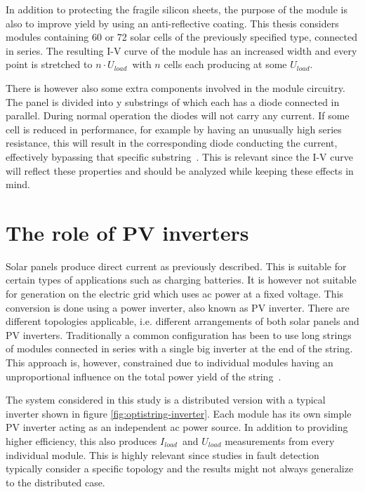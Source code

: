 
In addition to protecting the fragile silicon sheets, the purpose of the module is also to improve yield by using an anti-reflective coating.
This thesis considers modules containing 60 or 72 solar cells of the previously specified type, connected in series.
The resulting I-V curve of the module has an increased width and every point is stretched to $n \cdot U_{load}$ with $n$ cells each producing at some $U_{load}$.

There is however also some extra components involved in the module circuitry.
The panel is divided into y substrings of which each has a diode connected in parallel.
During normal operation the diodes will not carry any current.
If some cell is reduced in performance, for example by having an unusually high series resistance, this will result in the corresponding diode conducting the current, effectively bypassing that specific substring~\cite{Roman2006}.
This is relevant since the I-V curve will reflect these properties and should be analyzed while keeping these effects in mind.

\section{The role of PV inverters}
Solar panels produce direct current as previously described.
This is suitable for certain types of applications such as charging batteries.
It is however not suitable for generation on the electric grid which uses ac power at a fixed voltage.
This conversion is done using a power inverter, also known as PV inverter.
There are different topologies applicable, i.e. different arrangements of both solar panels and PV inverters.
Traditionally a common configuration has been to use long strings of modules connected in series with a single big inverter at the end of the string.
This approach is, however, constrained due to individual modules having an unproportional influence on the total power yield of the string~\cite{Roman2006}.


The system considered in this study is a distributed version with a typical inverter shown in figure \ref{fig:optistring-inverter}.
Each module has its own simple PV inverter acting as an independent ac power source.
In addition to providing higher efficiency, this also produces $I_{load}$ and $U_{load}$ measurements from every individual module.
This is highly relevant since studies in fault detection typically consider a specific topology and the results might not always generalize to the distributed case.

